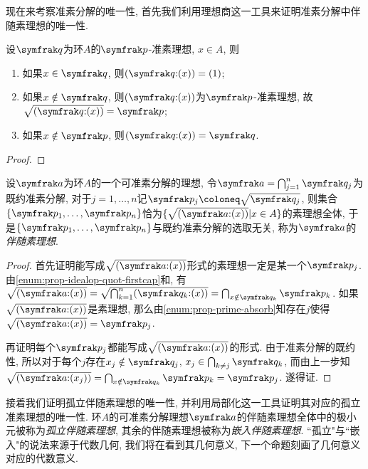 现在来考察准素分解的唯一性, 首先我们利用理想商这一工具来证明准素分解中伴随素理想的唯一性.

\begin{proposition}\label{prop:idealquotprimary}
  设$\ideal{q}$为环$A$的$\ideal{p}$-准素理想, $x\in A$, 则
  \begin{enumerate}
    \item 如果$x\in \ideal{q}$, 则$(\ideal{q}{:}(x))=(1)$;
    \item 如果$x\notin\ideal{q}$, 则$(\ideal{q}{:}(x))$为$\ideal{p}$-准素理想, 故$\sqrt{(\ideal{q}{:}(x))}=\ideal{p}$;
    \item 如果$x\notin\ideal{p}$, 则$(\ideal{q}{:}(x))=\ideal{q}$.
  \end{enumerate}
\end{proposition}

\begin{proof}
\end{proof}

\begin{theorem}\label{prop:primuniq1}
  设$\ideal{a}$为环$A$的一个可准素分解的理想, 令$\ideal{a}=\bigcap_{j=1}^n \ideal{q}_j$为既约准素分解, 对于$j=1, \dotsc, n$记$\ideal{p}_j\coloneq \sqrt{\ideal{q}_j}$, 则集合$\{\ideal{p}_1, \dotsc, \ideal{p}_n\}$恰为$\{\sqrt{(\ideal{a}{:}(x))}\vert x\in A\}$的素理想全体, 于是$\{\ideal{p}_1, \dotsc, \ideal{p}_n\}$与既约准素分解的选取无关, 称为$\ideal{a}$的\emph{伴随素理想}.
\end{theorem}

\begin{proof}
  首先证明能写成$\sqrt{(\ideal{a}{:}(x))}$形式的素理想一定是某一个$\ideal{p}_j$. 由\ref{enum:prop-idealop-quot-firstcap}和, 有$\sqrt{(\ideal{a}{:}(x))}=\sqrt{\bigcap_{k=1}^n(\ideal{q}_k{:}(x))}=\bigcap_{x\notin\ideal{q}_k}\ideal{p}_k$. 如果$\sqrt{(\ideal{a}{:}(x))}$是素理想, 那么由\ref{enum:prop-prime-absorb}知存在$j$使得$\sqrt{(\ideal{a}{:}(x))}=\ideal{p}_j$.

  再证明每个$\ideal{p}_j$都能写成$\sqrt{(\ideal{a}{:}(x))}$的形式. 由于准素分解的既约性, 所以对于每个$j$存在$x_j\notin\ideal{q}_j$, $x_j\in\bigcap_{k\neq j}\ideal{q}_k$, 而由上一步知$\sqrt{(\ideal{a}{:}(x_j))}=\bigcap_{x\notin\ideal{q}_k}\ideal{p}_k=\ideal{p}_j$. 遂得证.
\end{proof}

接着我们证明孤立伴随素理想的唯一性, 并利用局部化这一工具证明其对应的孤立准素理想的唯一性. 环$A$的可准素分解理想$\ideal{a}$的伴随素理想全体中的极小元被称为\emph{孤立伴随素理想}, 其余的伴随素理想被称为\emph{嵌入伴随素理想}. ``孤立"与``嵌入"的说法来源于代数几何, 我们将在看到其几何意义, 下一个命题刻画了几何意义对应的代数意义.

